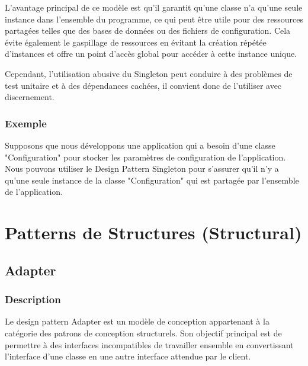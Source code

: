 \documentclass[french]{article}
\begin{document}
L'avantage principal de ce modèle est qu'il garantit qu'une classe n'a qu'une seule instance dans l'ensemble du programme, ce qui peut être utile pour des ressources partagées telles que des bases de données ou des fichiers de configuration. Cela évite également le gaspillage de ressources en évitant la création répétée d'instances et offre un point d'accès global pour accéder à cette instance unique.

Cependant, l'utilisation abusive du Singleton peut conduire à des problèmes de test unitaire et à des dépendances cachées, il convient donc de l'utiliser avec discernement.


\subsubsection{Exemple}

Supposons que nous développons une application qui a besoin d'une classe "Configuration" pour stocker les paramètres de configuration de l'application. Nous pouvons utiliser le Design Pattern Singleton pour s'assurer qu'il n'y a qu'une seule instance de la classe "Configuration" qui est partagée par l'ensemble de l'application.



\newpage




\section{Patterns de Structures (Structural)}

\subsection{Adapter}


\subsubsection{Description}

Le design pattern Adapter est un modèle de conception appartenant à la catégorie des patrons de conception structurels. Son objectif principal est de permettre à des interfaces incompatibles de travailler ensemble en convertissant l'interface d'une classe en une autre interface attendue par le client.
\end{document}
